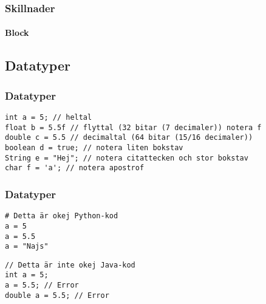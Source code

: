 \documentclass[aspectratio=169]{beamer}
\begin{document}
\begin{frame}[fragile]
    \frametitle{Skillnader}
    \framesubtitle{Block}





\end{frame}

\begin{frame}[fragile]

\end{frame}

\subsection{Datatyper}

\begin{frame}[fragile]
    \frametitle{Datatyper}


    \begin{lstlisting}[style=java]
int a = 5; // heltal
float b = 5.5f // flyttal (32 bitar (7 decimaler)) notera f
double c = 5.5 // decimaltal (64 bitar (15/16 decimaler))
boolean d = true; // notera liten bokstav
String e = "Hej"; // notera citattecken och stor bokstav
char f = 'a'; // notera apostrof
    \end{lstlisting}

\end{frame}

\begin{frame}[fragile]
    \frametitle{Datatyper}


    \begin{lstlisting}[style=python]
# Detta är okej Python-kod
a = 5
a = 5.5
a = "Najs"
    \end{lstlisting}

    \begin{lstlisting}[style=java]
// Detta är inte okej Java-kod
int a = 5;
a = 5.5; // Error
double a = 5.5; // Error
    \end{lstlisting}

\end{frame}
\end{document}
